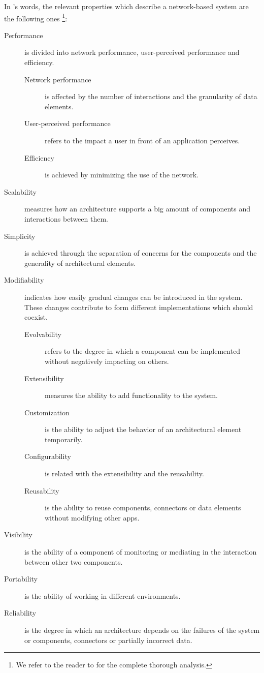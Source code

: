 In \citeauthor{fielding_architectural_2000}'s words, the relevant properties which describe a network-based system are the following ones \footnote{We refer to the reader to \citet{fielding_architectural_2000} for the complete thorough analysis.}:
\begin{description}
  \item[Performance] is divided into network performance, user-perceived performance and efficiency.
    \begin{description}
      \item[Network performance] is affected by the number of interactions and the granularity of data elements.
      \item[User-perceived performance] refers to the impact a user in front of an application perceives. %
      \item[Efficiency] is achieved by minimizing the use of the network.
    \end{description}
  \item[Scalability] measures how an architecture supports a big amount of components and interactions between them.
  \item[Simplicity] is achieved through the separation of concerns for the components and the generality of architectural elements.
  \item[Modifiability] indicates how easily gradual changes can be introduced in the system.
                       These changes contribute to form different implementations which should coexist.
    \begin{description}
      \item[Evolvability] refers to the degree in which a component can be implemented without negatively impacting on others.
      \item[Extensibility] measures the ability to add functionality to the system.
      \item[Customization] is the ability to adjust the behavior of an architectural element temporarily.
      \item[Configurability] is related with the extensibility and the reusability.
      \item[Reusability] is the ability to reuse components, connectors or data elements without modifying other apps.
    \end{description}
  \item[Visibility] is the ability of a component of monitoring or mediating in the interaction between other two components.
  \item[Portability] is the ability of working in different environments.
  \item[Reliability] is the degree in which an architecture depends on the failures of the system or components, connectors or partially incorrect data.
\end{description}

